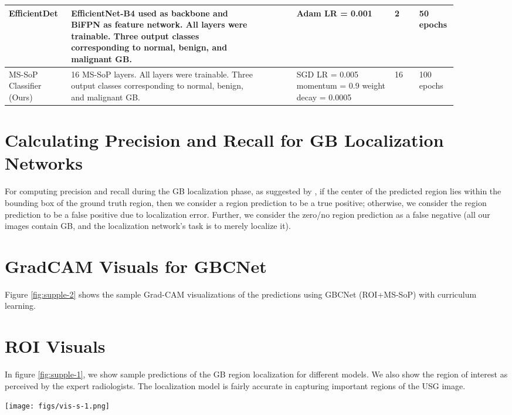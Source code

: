 \documentclass[10pt,twocolumn,letterpaper]{article}
\begin{document}
\begin{table*}[ht]
{\begin{tabular}{p{0.12\linewidth}p{0.4\linewidth}p{0.06\linewidth}p{0.2\linewidth}p{0.05\linewidth}p{0.06\linewidth}}
EfficientDet \cite{efficientdet} & EfficientNet-B4 used as backbone and BiFPN as feature network. All layers were trainable. Three output classes corresponding to normal, benign, and malignant GB. &  & Adam LR = 0.001 & 2 & 50 epochs \\ \hline
MS-SoP Classifier (Ours) & 16 MS-SoP layers. All layers were trainable. Three output classes corresponding to normal, benign, and malignant GB. &  & SGD LR = 0.005 momentum = 0.9 weight decay = 0.0005 & 16 & 100 epochs \\
\bottomrule
\end{tabular}
}
\caption{Implementation details for the different baseline networks used for classification and gallbladder localization.}
\label{tbl:configs}
\end{table*}

\section{Calculating Precision and Recall for GB Localization Networks}
\label{supp:eval_metric}
For computing precision and recall during the GB localization phase, as suggested by \cite{ribli2018detecting}, if the center of the predicted region lies within the bounding box of the ground truth region, then we consider a region prediction to be a true positive; otherwise, we consider the region prediction to be a false positive due to localization error. Further, we consider the zero/no region prediction as a false negative (all our images contain GB, and the localization network's task is to merely localize it). 

\section{GradCAM Visuals for GBCNet}
\label{supp:cam_vis}
Figure \ref{fig:supple-2} shows the sample Grad-CAM visualizations of the predictions using GBCNet (ROI+MS-SoP) with curriculum learning. 

\section{ROI Visuals}
\label{supp:roi_vis}
In figure \ref{fig:supple-1}, we show sample predictions of the GB region localization for different models. We also show the region of interest as perceived by the expert radiologists. The localization model is fairly accurate in capturing important regions of the USG image.

\begin{figure*}[t]
	\centering
	\texttt{[image: figs/vis-s-1.png]}
	\caption{Sample Grad-CAM visuals of GBCNet with curriculum learning. (a) Normal, (b) Benign, and (c)--(f) Malignant samples.}
	\label{fig:supple-2}
\end{figure*}
\end{document}
